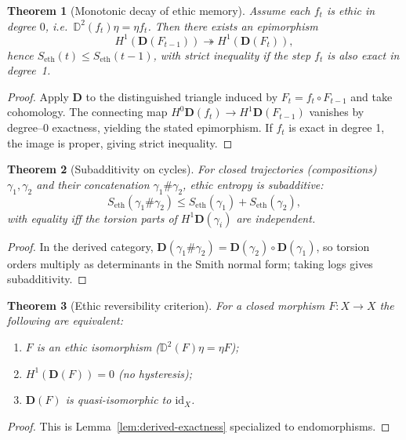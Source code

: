 \documentclass[12pt]{article}
\newcommand{\DD}{\mathbb{D}}
\theoremstyle{plain}
\newtheorem{theorem}{Theorem}[section]
\theoremstyle{definition}
\theoremstyle{remark}
\numberwithin{equation}{section}
\begin{document}
\begin{theorem}[Monotonic decay of ethic memory]\label{thm:decay}
Assume each $f_t$ is ethic in degree $0$, i.e.\ $\DD^2(f_t)\eta=\eta f_t$. Then there exists an epimorphism
\[
H^1(\mathbf D(F_{t-1}))\twoheadrightarrow H^1(\mathbf D(F_t)),
\]
hence $S_{\mathrm{eth}}(t)\le S_{\mathrm{eth}}(t-1)$, with strict inequality if the step $f_t$ is also exact in degree~1.
\end{theorem}

\begin{proof}
Apply $\mathbf D$ to the distinguished triangle induced by $F_t=f_t\circ F_{t-1}$ and take cohomology. The connecting map $H^0\mathbf D(f_t)\to H^1\mathbf D(F_{t-1})$ vanishes by degree--0 exactness, yielding the stated epimorphism. If $f_t$ is exact in degree 1, the image is proper, giving strict inequality.
\end{proof}

\begin{theorem}[Subadditivity on cycles]\label{thm:subadditive}
For closed trajectories (compositions) $\gamma_1,\gamma_2$ and their concatenation $\gamma_1\#\gamma_2$, ethic entropy is subadditive:
\[
S_{\mathrm{eth}}(\gamma_1\#\gamma_2)\le S_{\mathrm{eth}}(\gamma_1)+S_{\mathrm{eth}}(\gamma_2),
\]
with equality iff the torsion parts of $H^1\mathbf D(\gamma_i)$ are independent.
\end{theorem}

\begin{proof}
In the derived category, $\mathbf D(\gamma_1\#\gamma_2)=\mathbf D(\gamma_2)\circ \mathbf D(\gamma_1)$, so torsion orders multiply as determinants in the Smith normal form; taking logs gives subadditivity.
\end{proof}

\begin{theorem}[Ethic reversibility criterion]\label{thm:reversible}
For a closed morphism $F:X\to X$ the following are equivalent:
\begin{enumerate}[label=(\alph*)]
\item $F$ is an ethic isomorphism ($\DD^2(F)\eta=\eta F$);
\item $H^1(\mathbf D(F))=0$ (no hysteresis);
\item $\mathbf D(F)$ is quasi-isomorphic to $\mathrm{id}_X$.
\end{enumerate}
\end{theorem}

\begin{proof}
This is Lemma~\ref{lem:derived-exactness} specialized to endomorphisms.
\end{proof}
\end{document}
